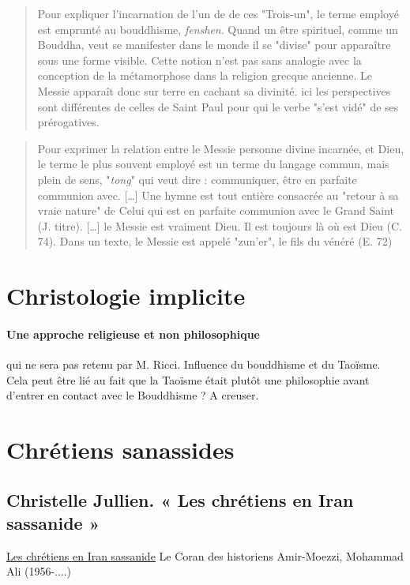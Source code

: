 \begin{quote}
    Pour expliquer l'incarnation de l'un de
de ces "Trois-un", le terme employé est emprunté au bouddhisme, \emph{fenshen}. Quand un être spirituel, comme un Bouddha, veut se manifester dans le monde il se "divise" pour apparaître sous une forme visible. Cette notion n'est pas sans analogie avec la conception de la métamorphose dans la religion grecque ancienne. Le Messie apparaît donc sur terre en cachant sa divinité. ici les perspectives sont différentes de celles de Saint Paul pour qui le verbe "s'est vidé" de ses prérogatives.  \cite[p.43]{Raguin:JesusMessieXian}
\end{quote}
\begin{quote}
    Pour exprimer la relation entre le Messie personne divine incarnée, et Dieu, le terme le plus souvent employé est un terme du langage commun, mais plein de sens, "\emph{tong}" qui veut dire : communiquer, être en parfaite communion avec. [\ldots] Une hymne est tout entière consacrée au "retour à sa vraie nature" de Celui qui est en parfaite communion avec le Grand Saint (J. titre). [\ldots] le Messie est vraiment Dieu. Il est toujours là où est Dieu (C. 74). Dans un texte, le Messie est appelé "zun'er", le fils du vénéré (E. 72) \cite[p.43]{Raguin:JesusMessieXian}
\end{quote}


\section{Christologie implicite}

\paragraph{Une approche religieuse et non philosophique} qui ne sera pas retenu par M. Ricci. Influence du bouddhisme et du Taoïsme. Cela peut être lié au fait que la Taoïsme était plutôt une philosophie avant d'entrer en contact avec le Bouddhisme ? A creuser.


\section{Chrétiens sanassides}

\subsection{Christelle Jullien. « Les chrétiens en Iran
sassanide »
}
\href{https://go.exlibris.link/YnGJKmGb}{Les chrétiens en Iran sassanide}
Le Coran des historiens
Amir-Moezzi, Mohammad Ali (1956-....)

